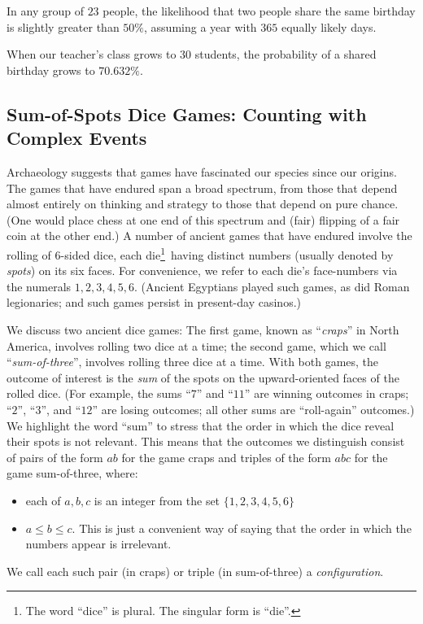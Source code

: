 \begin{prop}
In any group of $23$ people, the likelihood that two people share the same
birthday is slightly greater than $50\%$, assuming a year with $365$
equally likely days.
\end{prop}

When our teacher's class grows to 30 students, the probability of a shared birthday grows
to $70.632\%$.


\subsection{Sum-of-Spots Dice Games: Counting with Complex Events}
\label{sec:three-dice}

Archaeology suggests that games have fascinated our species since our origins.  The 
games that have endured span a broad spectrum, from those that depend almost entirely 
on thinking and strategy to those that depend on pure chance.  (One would place chess 
at one end of this spectrum and (fair) flipping of a fair coin at the other end.)  A number of 
ancient games that have endured involve the rolling of 6-sided dice, each die\footnote{The 
word ``dice'' is plural.  The singular form is ``die''.}~having distinct numbers (usually denoted
by {\it spots}) on its six faces.  For convenience, we refer to each die's face-numbers via the 
numerals $1, 2, 3, 4, 5, 6$.  (Ancient Egyptians played such games, as did Roman legionaries; 
and such games persist in present-day casinos.)

  
We discuss two ancient dice games: The first game, known as ``{\it craps}'' in North America, 
involves rolling two dice at a time; the second game, which we call ``{\it sum-of-three}'',
involves rolling three dice at a time.  With both games, the outcome of interest is the {\em sum} 
of the spots on the upward-oriented faces of the rolled dice.  (For example, the sums
``$7$'' and ``$11$'' are winning outcomes in craps; ``$2$'', ``$3$'', and ``$12$'' are losing 
outcomes; all other sums are ``roll-again'' outcomes.)  We highlight the word ``sum'' to 
stress that the order in which the dice reveal their spots is not relevant.  This means that the
outcomes we distinguish consist of pairs of the form $ab$ for the game
craps and triples of the form $abc$ for the game sum-of-three, where:
\begin{itemize}
\item
each of $a, b, c$ is an integer from the set $\{1, 2, 3, 4, 5, 6\}$
\item
$ a \leq b \leq c$.  This is just a convenient way of saying that the
  order in which the numbers appear is irrelevant.
\end{itemize}
We call each such pair (in craps) or triple (in sum-of-three) a {\it configuration}.

